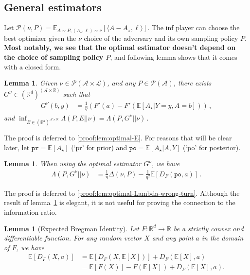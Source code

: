 \documentclass{article}
\theoremstyle{plain}
\newtheorem{lemma}[theorem]{Lemma}
\theoremstyle{definition}
\newcommand{\pr}{\texttt{pr}}
\newcommand{\po}{\texttt{po}}
\newcommand{\R}{\mathbb R}
\newcommand{\Rd}{\mathbb{R}^d}
\newcommand{\E}{\mathbb E}
\newcommand{\cL}{\mathcal L}
\newcommand{\cA}{\mathcal A}
\newcommand{\cP}{\mathcal P}
\begin{document}
\subsection{General estimators}
Let $\cP(\nu, P) = \E_{A \sim P, (A_\star, \ell) \sim \nu}\!\left[\langle A - A_\star, \ell \rangle\right]$.
The inf player can choose the best optimizer given the
$\nu$ choice of the adversary and its own sampling policy $P$.
\textbf{Most notably, we see that the optimal estimator doesn't depend on the choice of sampling policy $P$},
and following lemma shows that it comes with a closed form.
\begin{lemma}
    \label{lem:optimal-E}
    Given $\nu \in \cP(\cA \times \cL)$, and any $P \in \cP(\cA)$,
    there exists $G^\nu \in (\Rd)^{(\cA \times \R)}$ such that
    \begin{align*}
        G^\nu(b, y) & =
        \frac{1}{\eta}\left(
        F'(a) - F'(\E[A_\star|Y = y, A = b])
        \right)\,,
    \end{align*}
    and
    $
        \inf_{E \in (\Rd)^{\cA \times \R}}
        \Lambda(P, E || \nu)
        =
        \Lambda(P, G^\nu|| \nu)\,.
    $
\end{lemma}
\noindent The proof is deferred to \ref{proof:lem:optimal-E}.
For reasons that will be clear later, let
$\pr = \E[A_\star]$ (`pr' for prior) and
$\po = \E[A_\star|A, Y]$ (`po' for posterior).
\begin{lemma}
    \label{lem:optimal-Lambda-wrong-turn}
    When using the optimal estimator $G^\nu$, we have
    \begin{align*}
        \Lambda(P, G^\nu|| \nu)
         & = \frac{1}{\eta} \Delta(\nu, P)
        - \frac{1}{\eta^2}
        \E\!\left[
            D_F\left(\po, a\right)
            \right]\,.
    \end{align*}
\end{lemma}
\noindent The proof is deferred to \ref{proof:lem:optimal-Lambda-wrong-turn}.
Although the result of lemma~\ref{lem:optimal-Lambda-wrong-turn} is
elegant, it is not useful for proving the connection to the information ratio.
\begin{lemma}[Expected Bregman Identity]
    Let $F:\R^d \to \R$ be a strictly convex and differentiable function.
    For any random vector $X$ and any point $a$ in the domain of $F$, we have
    \begin{align*}
        \E\left[D_F(X, a)\right]
         & =
        \E\left[
            D_F\left( X, \E[X]\right)
            \right]
        +
        D_F\left( \E[X], a\right)
        \\
         & = \E[F(X)] - F(\E[X]) + D_F\left( \E[X], a\right).
    \end{align*}
\end{lemma}
\end{document}

